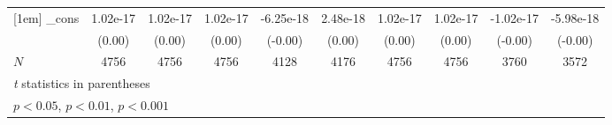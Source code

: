 {\begin{tabular}{l*{9}{c}}
[1em]
\_cons      &    1.02e-17         &    1.02e-17         &    1.02e-17         &   -6.25e-18         &    2.48e-18         &    1.02e-17         &    1.02e-17         &   -1.02e-17         &   -5.98e-18         \\
            &      (0.00)         &      (0.00)         &      (0.00)         &     (-0.00)         &      (0.00)         &      (0.00)         &      (0.00)         &     (-0.00)         &     (-0.00)         \\
\hline
\(N\)       &        4756         &        4756         &        4756         &        4128         &        4176         &        4756         &        4756         &        3760         &        3572         \\
\hline\hline
\multicolumn{10}{l}{\footnotesize \textit{t} statistics in parentheses}\\
\multicolumn{10}{l}{\footnotesize \sym{*} \(p<0.05\), \sym{**} \(p<0.01\), \sym{***} \(p<0.001\)}\\
\end{tabular}
}
